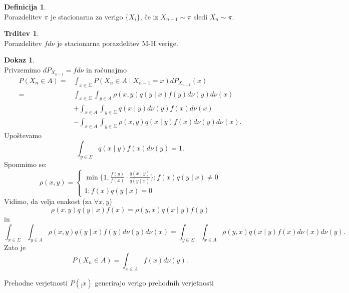\documentclass[a4paper, 12pt]{book}
\theoremstyle{definition}
\newtheorem{defn}[counter]{Definicija}
\newtheorem{claim}[counter]{Trditev}
\newtheorem{pro}[counter]{Dokaz}
\theoremstyle{remark}
\begin{document}
\begin{defn} \text{} \\
  Porazdelitev $\pi$ je stacionarna za verigo $\{X_i\}$, če iz $X_{n-1} \sim \pi$ sledi $X_n \sim \pi$.
\end{defn}
\begin{claim} \text{} \\
  Porazdelitev $f d\nu$ je stacionarna porazdelitev M-H verige.
\end{claim}
\begin{pro} \text{} \\
  Privzemimo $dP_{X_{n-1}} = f d\nu$ in računajmo
  \begin{align*}
    P(X_n \in A) =& \int_{x \in \Sigma} P(X_n \in A \mid X_{n-1} = x) dP_{X_{n-1}}(x) \\
    =& \int_{x \in \Sigma} \int_{y \in A} \rho(x,y) q(y \mid x) f(y) d\nu(y) d\nu(x) \\
      &+ \int_{x \in A} \int_{y \in \Sigma} q(x \mid y) d\nu(y) f(x) d\nu(x) \\
      &- \int_{x \in A} \int_{y \in \Sigma} \rho(x, y) q(x \mid y) f(x) d\nu(y) d\nu(x).
  \end{align*}
  Upoštevamo
  \begin{equation*}
    \int_{y \in \Sigma} q(x \mid y) f(x) d\nu(y) = 1.
  \end{equation*}
  Spomnimo se:
  \begin{equation*}
    \rho(x,y) = \begin{cases}
      \min \{1, \frac{f(y)}{f(x)} \cdot \frac{q(x \mid y)}{q(y \mid x)}\}; f(x) q(y \mid x) \neq 0 \\
      1; f(x) q(y \mid x) = 0
    \end{cases}
  \end{equation*}
  Vidimo, da velja enakost (za $\forall x, y$)
  \begin{equation*}
    \rho(x,y) q(y \mid x) f(x) = \rho(y,x) q(x \mid y) f(y)
  \end{equation*}
  in
  \begin{equation*}
    \int_{x \in \Sigma} \int_{y \in A} \rho(x,y) q(y \mid x) f(y) d\nu(y) d\nu(x) =
    \int_{y \in \Sigma} \int_{x \in A} \rho(y,x) q(x \mid y) f(x) d\nu(x) d\nu(y).
  \end{equation*}
  Zato je
  \begin{equation*}
    P(X_n \in A) = \int_{x \in A} f(x) d\nu(y).
  \end{equation*}
\end{pro}
Prehodne verjetnosti $P(_ \mid x)$ generirajo verigo prehodnih verjetnosti \\
\end{document}
